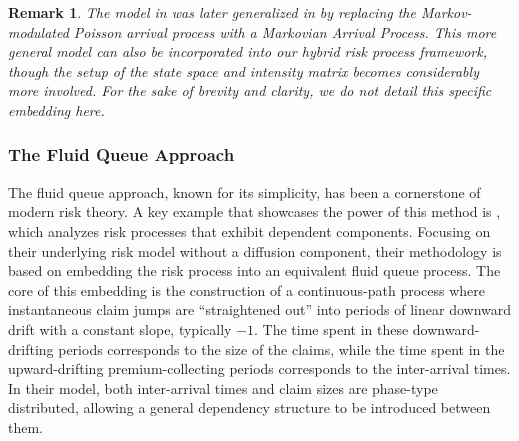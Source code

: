 \documentclass[11pt]{article}
\numberwithin{table}{section}
\numberwithin{figure}{section}
\numberwithin{equation}{section}
\newcommand{\1}{{\mathbf 1}}
\newcommand{\0}{\mat{0}}
\newtheorem{remark}{Remark}[section]
\begin{document}
\begin{remark}
The model in \cite{asmussen1996phase} was later generalized in \cite[Section 11.1.3]{bladt2017matrix} by replacing the Markov-modulated Poisson arrival process with a Markovian Arrival Process. This more general model can also be incorporated into our hybrid risk process framework, though the setup of the state space and intensity matrix becomes considerably more involved. For the sake of brevity and clarity, we do not detail this specific embedding here.
\end{remark}

\subsubsection*{The Fluid Queue Approach}

The fluid queue approach, known for its simplicity, has been a cornerstone of modern risk theory. A key example that showcases the power of this method is \cite{bladt2019parisian}, which analyzes risk processes that exhibit dependent components. Focusing on their underlying risk model without a diffusion component, their methodology is based on embedding the risk process into an equivalent fluid queue process. The core of this embedding is the construction of a continuous-path process where instantaneous claim jumps are ``straightened out'' into periods of linear downward drift with a constant slope, typically $-1$. The time spent in these downward-drifting periods corresponds to the size of the claims, while the time spent in the upward-drifting premium-collecting periods corresponds to the inter-arrival times. In their model, both inter-arrival times and claim sizes are phase-type distributed, allowing a general dependency structure to be introduced between them.
\end{document}
